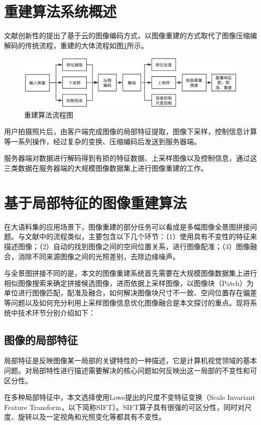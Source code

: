 \documentclass[UTF8]{csoarticle}
\begin{document}
\section{重建算法系统概述}
文献\cite{Cloud}创新性的提出了基于云的图像编码方式，以图像重建的方式取代了图像压缩编解码的传统流程，重建的大体流程如图\ref{fig:flow}所示。

\begin{figure}
\centering\includegraphics[width=15cm]{flowchart}
\caption{重建算法流程图}
\label{fig:flow}
\end{figure}

用户拍摄照片后，由客户端完成图像的局部特征提取，图像下采样，控制信息计算等一系列操作，经过复杂的变换、压缩编码后发送到服务器端。

服务器端对数据进行解码得到有损的特征数据、上采样图像以及控制信息，通过这三类数据在服务器端的大规模图像数据集上进行图像重建的工作。

\section{基于局部特征的图像重建算法}
在大语料集的应用场景下，图像重建的部分任务可以看成是多幅图像全景图拼接问题。与文献\cite{Brown:2006ir}中的流程类似，主要包含以下几个环节：（1）使用具有不变性的特征来描述图像；（2）自动的找到图像之间的空间位置关系，进行图像配准；（3）图像融合，消除不同来源图像之间的光照差别，去除边缘噪声。

与全景图拼接不同的是，本文的图像重建系统首先需要在大规模图像数据集上进行相似图像搜索来确定拼接候选图像，进而依据上采样图像，以图像块（Patch）为单位进行图像匹配，配准及融合，如何解决图像块尺寸不一致、空间位置存在偏差等问题以及如何充分利用上采样图像信息优化图像融合是本文探讨的重点。现将系统中技术环节分别介绍如下：

\subsection{图像的局部特征}
局部特征是反映图像某一局部的关键特性的一种描述，它是计算机视觉领域的基本问题。对局部特性进行描述需要解决的核心问题如何反映出这一局部的不变性和可区分性。

在多种局部特征中，本文选择使用Lowe提出的尺度不变特征变换（Scale Invariant Feature Transform，以下简称SIFT）。SIFT算子具有很强的可区分性，同时对尺度、旋转以及一定视角和光照变化等都具有不变性。
\end{document}
